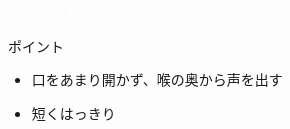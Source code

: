 \documentclass[aspectratio=169,xcolor={dvipsnames,table}]{beamer}
\begin{document}
\begin{frame}
\centering
  \textcolor{white}{\Huge\bfseries Today's Pronunciation}\pause

 \vspace{30pt}

  \textcolor{white}{\Huge\bfseries \textipa{/\textturnv /}}
\end{frame}
\begin{frame}[plain]{\textipa{/\textturnv /}}

\Huge
 \textipa{/\textturnv /}

\vspace*{20pt}

\normalsize
ポイント

\begin{itemize}
 \item 口をあまり開かず、喉の奥から声を出す
 \item 短くはっきり
\end{itemize}
\end{frame}

\end{document}
